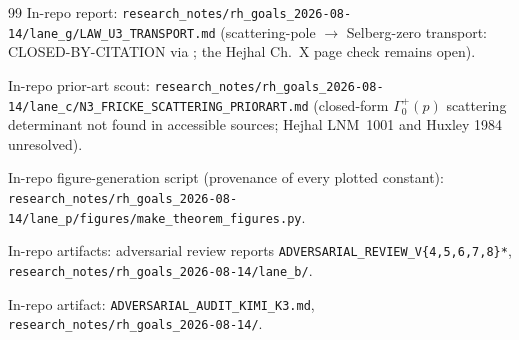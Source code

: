 \documentclass[11pt]{article}
\theoremstyle{definition}
\theoremstyle{remark}
\begin{document}
\begin{thebibliography}{99}
In-repo report:
\texttt{research\_notes/rh\_goals\_2026-08-14/lane\_g/LAW\_U3\_TRANSPORT.md}
(scattering-pole $\to$ Selberg-zero transport: CLOSED-BY-CITATION via
\cite{BFM13,Teo20}; the Hejhal Ch.~X page check remains open).

In-repo prior-art scout:
\texttt{research\_notes/rh\_goals\_2026-08-14/lane\_c/N3\_FRICKE\_SCATTERING\_PRIORART.md}
(closed-form $\Gamma_0^+(p)$ scattering determinant not found in
accessible sources; Hejhal LNM~1001 and Huxley 1984 unresolved).

In-repo figure-generation script (provenance of every plotted constant):
\texttt{research\_notes/rh\_goals\_2026-08-14/lane\_p/figures/make\_theorem\_figures.py}.

In-repo artifacts: adversarial review reports
\texttt{ADVERSARIAL\_REVIEW\_V\{4,5,6,7,8\}*},
\texttt{research\_notes/rh\_goals\_2026-08-14/lane\_b/}.

In-repo artifact: \texttt{ADVERSARIAL\_AUDIT\_KIMI\_K3.md},
\texttt{research\_notes/rh\_goals\_2026-08-14/}.

\end{thebibliography}
\end{document}
